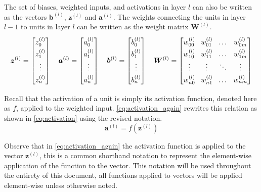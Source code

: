 The set of biases, weighted inputs, and activations in layer $l$ can also be written as the vectors $\bm{b}^{(l)}$, $\bm{z}^{(l)}$ and $\bm{a}^{(l)}$. The weights connecting the units in layer $l-1$ to units in layer $l$ can be written as the weight matrix $\bm{W}^{(l)}$.
\begin{equation*}
    \renewcommand{\arraystretch}{1.4}
    \setlength\arraycolsep{4pt}
    \bm{z}^{(l)} = \begin{bmatrix}
        z_{0}^{(l)} \\
        z_{1}^{(l)} \\
        \vdots \\
        z_{n}^{(l)}
    \end{bmatrix}
    \quad
    \bm{a}^{(l)} = \begin{bmatrix}
        a_{0}^{(l)} \\
        a_{1}^{(l)} \\
        \vdots \\
        a_{n}^{(l)}
    \end{bmatrix}
    \quad
    \bm{b}^{(l)} = \begin{bmatrix}
        b_{0}^{(l)} \\
        b_{1}^{(l)} \\
        \vdots \\
        b_{n}^{(l)}
    \end{bmatrix}
    \quad
    \bm{W}^{(l)} = \begin{bmatrix}
        w_{00}^{(l)} & w_{01}^{(l)} & \dots  & w_{0m}^{(l)} \\
        w_{10}^{(l)} & w_{11}^{(l)} & \dots  & w_{1m}^{(l)} \\
        \vdots       & \vdots       & \ddots & \vdots \\
        w_{n0}^{(l)} & w_{n1}^{(l)} & \dots  & w_{nm}^{(l)}
    \end{bmatrix}
\end{equation*}

Recall that the activation of a unit is simply its activation function, denoted here as $f$, applied to the weighted input. \autoref{eq:activation_again} rewrites this relation as shown in \autoref{eq:activation} using the revised notation.
\begin{equation} \label{eq:activation_again}
    \bm{a}^{(l)} = f\left( \bm{z}^{(l)} \right)
\end{equation}

Observe that in \autoref{eq:activation_again} the activation function is applied to the vector $\bm{z}^{(l)}$, this is a common shorthand notation to represent the element-wise application of the function to the vector. This notation will be used throughout the entirety of this document, all functions applied to vectors will be applied element-wise unless otherwise noted.

